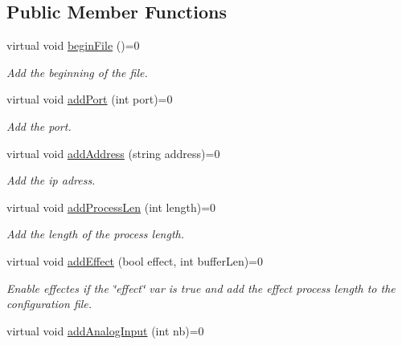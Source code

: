 \subsection*{Public Member Functions}
\begin{DoxyCompactItemize}
\item 
\mbox{\label{class_g_u_i_file_setting_builder_ac8e6636b1a2691d9299cd2e9b1e57ba3}} 
virtual void \mbox{\hyperlink{class_g_u_i_file_setting_builder_ac8e6636b1a2691d9299cd2e9b1e57ba3}{begin\+File}} ()=0
\begin{DoxyCompactList}\small\item\em Add the beginning of the file. \end{DoxyCompactList}\item 
virtual void \mbox{\hyperlink{class_g_u_i_file_setting_builder_a7af95f9102bb6b78f6f0b8827b19b286}{add\+Port}} (int port)=0
\begin{DoxyCompactList}\small\item\em Add the port. \end{DoxyCompactList}\item 
virtual void \mbox{\hyperlink{class_g_u_i_file_setting_builder_a4dff49cea1e4861e66ed57e258b702da}{add\+Address}} (string address)=0
\begin{DoxyCompactList}\small\item\em Add the ip adress. \end{DoxyCompactList}\item 
virtual void \mbox{\hyperlink{class_g_u_i_file_setting_builder_a958259a35215b686477839872752a0dc}{add\+Process\+Len}} (int length)=0
\begin{DoxyCompactList}\small\item\em Add the length of the process length. \end{DoxyCompactList}\item 
virtual void \mbox{\hyperlink{class_g_u_i_file_setting_builder_aac6a7c5d7d56144ad40e9dcacb4b17d6}{add\+Effect}} (bool effect, int buffer\+Len)=0
\begin{DoxyCompactList}\small\item\em Enable effectes if the \char`\"{}effect\char`\"{} var is true and add the effect process length to the configuration file. \end{DoxyCompactList}\item 
virtual void \mbox{\hyperlink{class_g_u_i_file_setting_builder_ac219ca2fecb545689b3e06857d77be73}{add\+Analog\+Input}} (int nb)=0

\end{DoxyCompactItemize}
